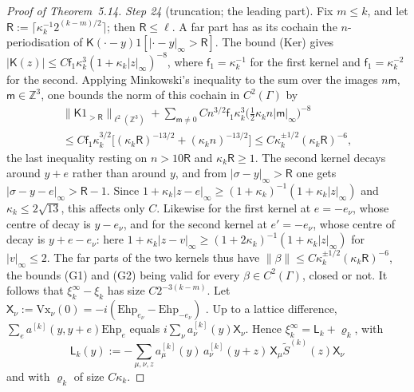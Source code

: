 \documentclass[11pt,letterpaper,reqno]{amsart}
\theoremstyle{definition}
\begin{document}
\begin{proof}[Proof of Theorem~5.14]
\emph{Step 24} (truncation; the leading part).
Fix $m\le k$, and let $\mathsf R:=\lceil\kappa_k^{-1}2^{(k-m)/2}\rceil$; then $\mathsf R\le\ell$.
A far part has as its cochain the $n$-periodisation of $\mathsf K(\cdot-y)1[|\cdot-y|_\infty>\mathsf R]$.
The bound (Ker) gives $|\mathsf K(z)|\le C\mathsf f_1\kappa_k^3(1+\kappa_k|z|_\infty)^{-8}$, where $\mathsf f_1=\kappa_k^{-1}$ for the first kernel and $\mathsf f_1=\kappa_k^{-2}$ for the second.
Applying Minkowski's inequality to the sum over the images $n\mathsf m$, $\mathsf m\in\mathbb Z^3$, one bounds the norm of this cochain in $C^2(\Gamma)$ by
\begin{multline*}
\|\mathsf K1_{>\mathsf R}\|_{\ell^2(\mathbb Z^3)}+\sum_{\mathsf m\ne0}Cn^{3/2}\mathsf f_1\kappa_k^3\bigl(\tfrac12\kappa_kn|\mathsf m|_\infty\bigr)^{-8}\\
\le C\mathsf f_1\kappa_k^{3/2}\bigl[(\kappa_k\mathsf R)^{-13/2}+(\kappa_kn)^{-13/2}\bigr]\le C\kappa_k^{\pm1/2}(\kappa_k\mathsf R)^{-6},
\end{multline*}
the last inequality resting on $n>10\mathsf R$ and $\kappa_k\mathsf R\ge1$.
The second kernel decays around $y+e$ rather than around $y$, and from $|\sigma-y|_\infty>\mathsf R$ one gets $|\sigma-y-e|_\infty>\mathsf R-1$.
Since $1+\kappa_k|z-e|_\infty\ge(1+\kappa_k)^{-1}(1+\kappa_k|z|_\infty)$ and $\kappa_k\le2\sqrt{13}$, this affects only $C$.
Likewise for the first kernel at $e=-e_\nu$, whose centre of decay is $y-e_\nu$, and for the second kernel at $e'=-e_\nu$, whose centre of decay is $y+e-e_\nu$: here $1+\kappa_k|z-v|_\infty\ge(1+2\kappa_k)^{-1}(1+\kappa_k|z|_\infty)$ for $|v|_\infty\le2$.
The far parts of the two kernels thus have $\|\beta\|\le C\kappa_k^{\pm1/2}(\kappa_k\mathsf R)^{-6}$, the bounds (G1) and (G2) being valid for every $\beta\in C^2(\Gamma)$, closed or not.
It follows that $\xi_k^\infty-\xi_k$ has size $C2^{-3(k-m)}$.
Let $\mathsf X_\nu:=\allowbreak \mathrm{Vx}_\nu(0)=\allowbreak -i(\mathrm{Ehp}_{e_\nu}-\mathrm{Ehp}_{-e_\nu})$ \cite[Proposition~37.1\,(d)]{QEDIII}.
Up to a lattice difference, $\sum_ea^{[k]}(y,y+e)\mathrm{Ehp}_e$ equals $i\sum_\nu a^{[k]}_\nu(y)\mathsf X_\nu$.
Hence $\xi_k^\infty=\mathsf L_k+\varrho_k$, with
\begin{equation*}
\mathsf L_k(y):=-\sum_{\mu,\nu,z}a^{[k]}_\mu(y)\,a^{[k]}_\nu(y+z)\,\mathsf X_\mu\tilde S^{(k)}(z)\mathsf X_\nu
\end{equation*}
and with $\varrho_k$ of size $C\kappa_k$.


\end{proof}
\end{document}
